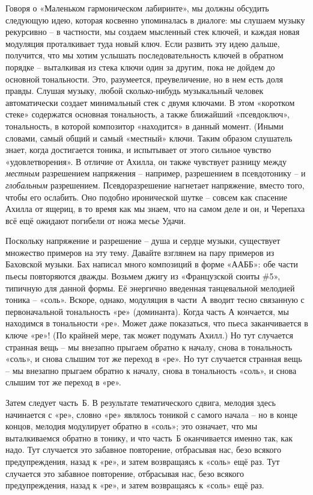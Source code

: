 \documentclass[../main.tex]{subfiles}
\begin{document}
Говоря о «Маленьком гармоническом лабиринте», мы должны обсудить следующую идею, которая косвенно упоминалась в диалоге: мы слушаем музыку рекурсивно \--- в частности, мы создаем мысленный стек ключей, и каждая новая модуляция проталкивает туда новый ключ. Если развить эту идею дальше, получится, что мы хотим услышать последовательность ключей в обратном порядке \--- выталкивая из стека ключи один за другим, пока не дойдем до основной тональности. Это, разумеется, преувеличение, но в нем есть доля правды. Слушая музыку, любой сколько-нибудь музыкальный человек автоматически создает минимальный стек с двумя ключами. В этом «коротком стеке» содержатся основная тональность, а также ближайший «псевдоключ», тональность, в которой композитор «находится» в данный момент. (Иными словами, самый общий и самый «местный» ключи. Таким образом слушатель знает, когда достигается тоника, и испытывает от этого сильное чувство «удовлетворения». В отличие от Ахилла, он также чувствует разницу между \emph{местным} разрешением напряжения \--- например, разрешением в псевдотонику \--- и \emph{глобальным} разрешением. Псевдоразрешение нагнетает напряжение, вместо того, чтобы его ослабить. Оно подобно иронической шутке \--- совсем как спасение Ахилла от ящериц, в то время как мы знаем, что на самом деле и он, и Черепаха всё ещё ожидают погибели от ножа месье Удачи.

Поскольку напряжение и разрешение \--- душа и сердце музыки, существует множество примеров на эту тему. Давайте взглянем на пару примеров из Баховской музыки. Бах написал много композиций в форме «ААББ»: обе части пьесы повторяются дважды. Возьмем джигу из «Французской сюиты \#5», типичную для данной формы. Её энергично введенная танцевальной мелодией тоника \--- «соль». Вскоре, однако, модуляция в части~А вводит тесно связанную с первоначальной тональность «ре» (доминанта). Когда часть А кончается, мы находимся в тональности «ре». Может даже показаться, что пьеса заканчивается в ключе «ре»! (По крайней мере, так может подумать Ахилл.) Но тут случается странная вещь \--- мы внезапно прыгаем обратно к началу, снова в тональность «соль», и снова слышим тот же переход в «ре». Но тут случается странная вещь \--- мы внезапно прыгаем обратно к началу, снова в тональность «соль», и снова слышим тот же переход в «ре».

Затем следует часть~Б\@. В результате тематического сдвига, мелодия здесь начинается с «ре», словно «ре» являлось тоникой с самого начала \--- но в конце концов, мелодия модулирует обратно в «соль»; это означает, что мы выталкиваемся обратно в тонику, и что часть~Б оканчивается именно так, как надо. Тут случается это забавное повторение, отбрасывая нас, безо всякого предупреждения, назад к «ре», и затем возвращаясь к «соль» ещё раз. Тут случается это забавное повторение, отбрасывая нас, безо всякого предупреждения, назад к «ре», и затем возвращаясь к «соль» ещё раз.
\end{document}
